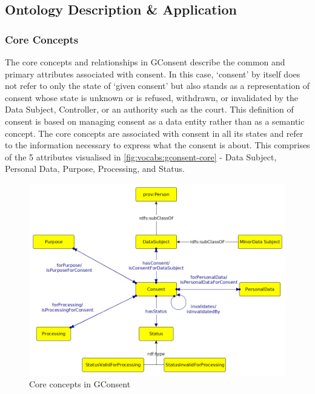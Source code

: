 \subsection{Ontology Description \& Application}
\subsubsection{Core Concepts}
The core concepts and relationships in GConsent describe the common and primary attributes associated with consent.
In this case, `consent' by itself does not refer to only the state of `given consent' but also stands as a representation of consent whose state is unknown or is refused, withdrawn, or invalidated by the Data Subject, Controller, or an authority such as the court. This definition of consent is based on managing consent as a data entity rather than as a semantic concept. 
The core concepts are associated with consent in all its states and refer to the information necessary to express what the consent is about. This comprises of the 5 attributes visualised in \autoref{fig:vocabs:gconsent-core} - Data Subject, Personal Data, Purpose, Processing, and Status.
\begin{figure}[htbp]
    \centering
    \includegraphics[width=0.8\linewidth]{img/gconsent_core.png}
    \caption{Core concepts in GConsent \cite{pandit_gconsent_2019}}
    \label{fig:vocabs:gconsent-core}
\end{figure}

